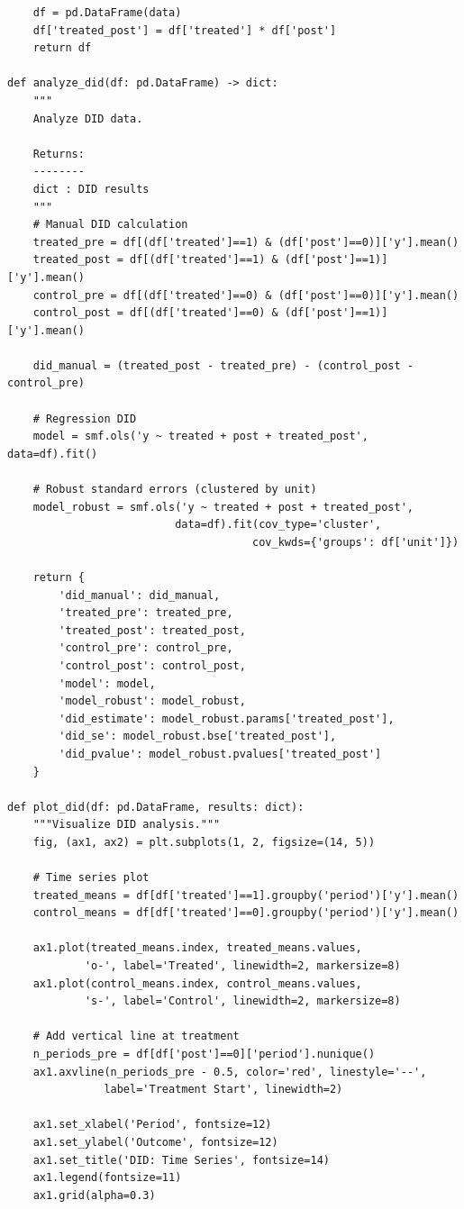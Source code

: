 \begin{lstlisting}
    df = pd.DataFrame(data)
    df['treated_post'] = df['treated'] * df['post']
    return df

def analyze_did(df: pd.DataFrame) -> dict:
    """
    Analyze DID data.

    Returns:
    --------
    dict : DID results
    """
    # Manual DID calculation
    treated_pre = df[(df['treated']==1) & (df['post']==0)]['y'].mean()
    treated_post = df[(df['treated']==1) & (df['post']==1)]['y'].mean()
    control_pre = df[(df['treated']==0) & (df['post']==0)]['y'].mean()
    control_post = df[(df['treated']==0) & (df['post']==1)]['y'].mean()

    did_manual = (treated_post - treated_pre) - (control_post - control_pre)

    # Regression DID
    model = smf.ols('y ~ treated + post + treated_post', data=df).fit()

    # Robust standard errors (clustered by unit)
    model_robust = smf.ols('y ~ treated + post + treated_post',
                          data=df).fit(cov_type='cluster',
                                      cov_kwds={'groups': df['unit']})

    return {
        'did_manual': did_manual,
        'treated_pre': treated_pre,
        'treated_post': treated_post,
        'control_pre': control_pre,
        'control_post': control_post,
        'model': model,
        'model_robust': model_robust,
        'did_estimate': model_robust.params['treated_post'],
        'did_se': model_robust.bse['treated_post'],
        'did_pvalue': model_robust.pvalues['treated_post']
    }

def plot_did(df: pd.DataFrame, results: dict):
    """Visualize DID analysis."""
    fig, (ax1, ax2) = plt.subplots(1, 2, figsize=(14, 5))

    # Time series plot
    treated_means = df[df['treated']==1].groupby('period')['y'].mean()
    control_means = df[df['treated']==0].groupby('period')['y'].mean()

    ax1.plot(treated_means.index, treated_means.values,
            'o-', label='Treated', linewidth=2, markersize=8)
    ax1.plot(control_means.index, control_means.values,
            's-', label='Control', linewidth=2, markersize=8)

    # Add vertical line at treatment
    n_periods_pre = df[df['post']==0]['period'].nunique()
    ax1.axvline(n_periods_pre - 0.5, color='red', linestyle='--',
               label='Treatment Start', linewidth=2)

    ax1.set_xlabel('Period', fontsize=12)
    ax1.set_ylabel('Outcome', fontsize=12)
    ax1.set_title('DID: Time Series', fontsize=14)
    ax1.legend(fontsize=11)
    ax1.grid(alpha=0.3)


\end{lstlisting}
